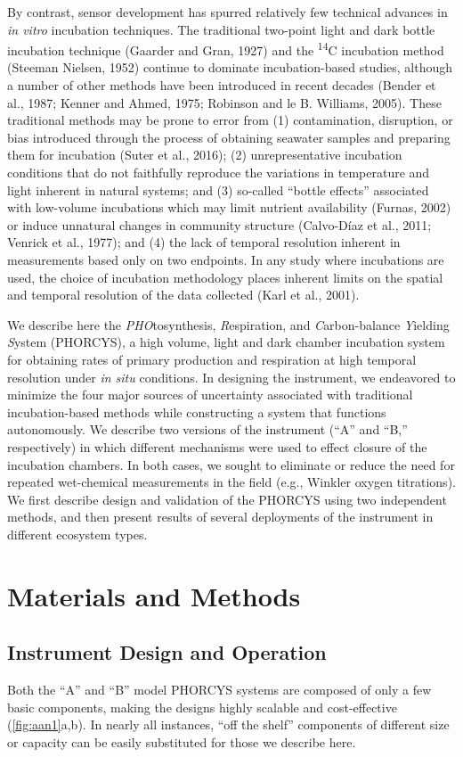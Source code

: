 By contrast, sensor development has spurred relatively few technical advances in \emph{in vitro} incubation techniques. The traditional two-point light and dark bottle incubation technique (Gaarder and Gran, 1927) and the \textsuperscript{14}C incubation method (Steeman Nielsen, 1952) continue to dominate incubation-based studies, although a number of other methods have been introduced in recent decades (Bender et al., 1987; Kenner and Ahmed, 1975; Robinson and le B. Williams, 2005). These traditional methods may be prone to error from (1) contamination, disruption, or bias introduced through the process of obtaining seawater samples and preparing them for incubation (Suter et al., 2016); (2) unrepresentative incubation conditions that do not faithfully reproduce the variations in temperature and light inherent in natural systems; and (3) so-called ``bottle effects'' associated with low-volume incubations which may limit nutrient availability (Furnas, 2002) or induce unnatural changes in community structure (Calvo-Díaz et al., 2011; Venrick et al., 1977); and (4) the lack of temporal resolution inherent in measurements based only on two endpoints. In any study where incubations are used, the choice of incubation methodology places inherent limits on the spatial and temporal resolution of the data collected (Karl et al., 2001).

We describe here the \emph{PHO}tosynthesis, \emph{R}espiration, and \emph{C}arbon-balance \emph{Y}ielding \emph{S}ystem (PHORCYS), a high volume, light and dark chamber incubation system for obtaining rates of primary production and respiration at high temporal resolution under \emph{in situ} conditions. In designing the instrument, we endeavored to minimize the four major sources of uncertainty associated with traditional incubation-based methods while constructing a system that functions autonomously. We describe two versions of the instrument (``A'' and ``B,'' respectively) in which different mechanisms were used to effect closure of the incubation chambers. In both cases, we sought to eliminate or reduce the need for repeated wet-chemical measurements in the field (e.g., Winkler oxygen titrations). We first describe design and validation of the PHORCYS using two independent methods, and then present results of several deployments of the instrument in different ecosystem types.
\section{Materials and Methods}
\subsection{Instrument Design and Operation}
Both the ``A'' and ``B'' model PHORCYS systems are composed of only a few basic components, making the designs highly scalable and cost-effective (\autoref{fig:aan1}a,b). In nearly all instances, ``off the shelf'' components of different size or capacity can be easily substituted for those we describe here.

